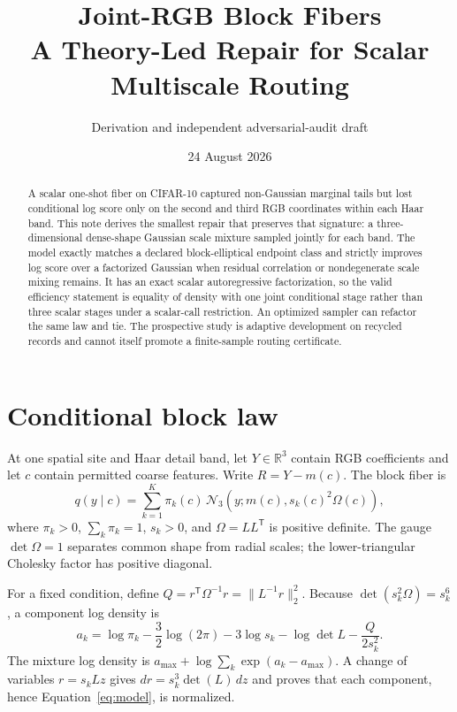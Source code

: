 \documentclass[11pt]{article}
\title{Joint-RGB Block Fibers\\\large A Theory-Led Repair for Scalar Multiscale Routing}
\author{Derivation and independent adversarial-audit draft}
\date{24 August 2026}
\newcommand{\R}{\mathbb R}
\begin{document}
\maketitle

\begin{abstract}
A scalar one-shot fiber on CIFAR-10 captured non-Gaussian marginal tails but lost conditional log score only on the second and third RGB coordinates within each Haar band.  This note derives the smallest repair that preserves that signature: a three-dimensional dense-shape Gaussian scale mixture sampled jointly for each band.  The model exactly matches a declared block-elliptical endpoint class and strictly improves log score over a factorized Gaussian when residual correlation or nondegenerate scale mixing remains.  It has an exact scalar autoregressive factorization, so the valid efficiency statement is equality of density with one joint conditional stage rather than three scalar stages under a scalar-call restriction.  An optimized sampler can refactor the same law and tie.  The prospective study is adaptive development on recycled records and cannot itself promote a finite-sample routing certificate.
\end{abstract}

\section{Conditional block law}

At one spatial site and Haar detail band, let $Y\in\R^3$ contain RGB coefficients and let $c$ contain permitted coarse features.  Write $R=Y-m(c)$.  The block fiber is
\begin{equation}
 q(y\mid c)=\sum_{k=1}^{K}\pi_k(c)\,
 \mathcal N_3\!\left(y;m(c),s_k(c)^2\Omega(c)\right),
 \label{eq:model}
\end{equation}
where $\pi_k>0$, $\sum_k\pi_k=1$, $s_k>0$, and $\Omega=LL^{\mathsf T}$ is positive definite.  The gauge $\det\Omega=1$ separates common shape from radial scales; the lower-triangular Cholesky factor has positive diagonal.

For a fixed condition, define $Q=r^{\mathsf T}\Omega^{-1}r=\|L^{-1}r\|_2^2$.  Because $\det(s_k^2\Omega)=s_k^6$, a component log density is
\begin{equation}
 a_k=\log\pi_k-\frac32\log(2\pi)-3\log s_k-\log\det L-\frac{Q}{2s_k^2}.
 \label{eq:component}
\end{equation}
The mixture log density is $a_{\max}+\log\sum_k\exp(a_k-a_{\max})$.  A change of variables $r=s_kLz$ gives $dr=s_k^3\det(L)\,dz$ and proves that each component, hence Equation~\eqref{eq:model}, is normalized.
\end{document}
